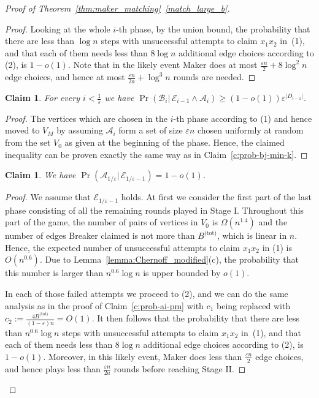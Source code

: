 \documentclass[11pt, a4paper]{article}
\numberwithin{equation}{section}
\numberwithin{figure}{section}
\newtheorem{claim}[theorem]{Claim}
\newcommand{\eps}{\varepsilon}
\begin{document}
\begin{proof}[Proof of Theorem~\ref{thm:maker_matching}~\ref{match_large_b}]
\begin{proof}
Looking at the whole $i$-th phase, by the union bound, the probability that there are less than $\log n$ steps with unsuccessful attempts to claim $x_1x_2$ in~(1), and that each of them needs less than $8 \log n$ additional edge choices according to (2), is $1-o(1)$. Note that in the likely event Maker does at most $\frac{\eps n}{2} + 8 \log^2 n$ edge choices, and hence at most $\frac{\eps n}{2a} + \log^3n$ rounds are needed.
\end{proof}

\begin{claim} \label{c:prob-bi-pm}
For every $i<\frac{1}{\eps}$ we have $\operatorname{Pr}(\mathcal{B}_i|\, \mathcal{E}_{i-1} \land \mathcal{A}_i) \geq (1-o(1)) \varepsilon^{|D_{i-1}|}$.
\end{claim}

\begin{proof}
The vertices which are chosen in the $i$-th phase 
according to (1) and hence moved to $V_M$ by assuming 
$\mathcal{A}_i$ form a set of size $\varepsilon n$
chosen uniformly at random from the set $V_0$ as given at the beginning of the phase. Hence, the claimed inequality
can be proven exactly the same way as in 
Claim~\ref{c:prob-bj-min-k}.
\end{proof}

\begin{claim} \label{c:prob-last-ai-pm}
We have $\operatorname{Pr}(\mathcal{A}_{1/\eps}|\, \mathcal{E}_{1/\eps-1}) = 1-o(1)$.
\end{claim}

\begin{proof}
We assume that $\mathcal{E}_{1/\eps-1}$ holds.
At first we consider the first part of the last phase
consisting of all the remaining rounds played in Stage I.
Throughout this part of the game, 
the number of pairs of vertices in $V_0$ is $\Omega(n^{1.4})$ and the number of edges Breaker claimed is not more than $B^{\text{(tot)}}$, which is linear in $n$. Hence, the expected number of unsuccessful attempts to claim $x_1x_2$ in (1) is $O(n^{0.6})$. 
Due to Lemma~\ref{lemma:Chernoff_modified}(c), the probability that this number is larger than $n^{0.6}\log n$ is upper bounded by $o(1)$.


In each of those failed attempts we proceed to (2),
and we can do the same analysis as in the proof of Claim~\ref{c:prob-ai-pm} with $c_1$
being replaced with $c_2 := \frac{4B^{\text{(tot)}}}{(1 - \eps) n} = O(1)$. It then follows that
the probability that there are less than $n^{0.6}\log n$ steps with unsuccessful attempts to claim $x_1x_2$ in~(1), and that each of them needs less than $8 \log n$ additional edge choices according to (2), is $1-o(1)$. 
Moreover, in this likely event, Maker does less than
$\frac{\varepsilon n}{2}$ edge choices,
and hence plays less than $\frac{\varepsilon n}{2a}$ rounds
before reaching Stage II.


\end{proof}
\end{proof}
\end{document}
